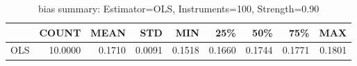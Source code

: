 \begin{table}[ht]
\centering
\caption{bias summary: Estimator=OLS, Instruments=100, Strength=0.90}
\begin{tabular}{lrrrrrrrr}
\toprule
 & COUNT & MEAN & STD & MIN & 25\% & 50\% & 75\% & MAX \\
\midrule
OLS & 10.0000 & 0.1710 & 0.0091 & 0.1518 & 0.1660 & 0.1744 & 0.1771 & 0.1801 \\
\bottomrule
\end{tabular}
\end{table}
